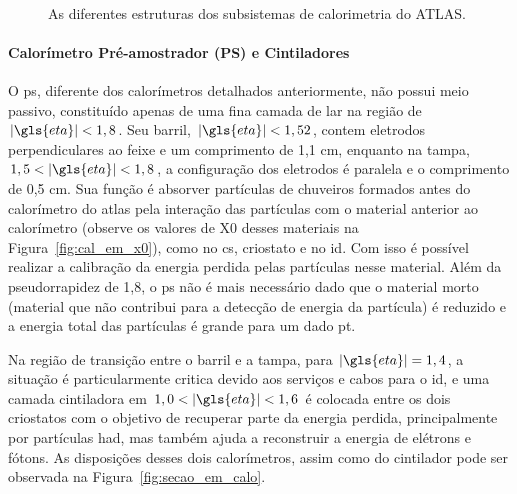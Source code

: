 \begin{figure}[ht!]
\begin{center}
{        }\hspace{0.01\textwidth}
         \\
%
    \end{center}
    \caption[As diferentes estruturas dos subsistemas de calorimetria do ATLAS]{%
As diferentes estruturas dos subsistemas de calorimetria do ATLAS.
     }%
\end{figure}


\paragraph{Calorímetro Pré-amostrador (PS) e Cintiladores}
\label{par:cal_ps}

O \gls{ps}, diferente dos calorímetros detalhados anteriormente, não possui meio passivo, 
constituído apenas de uma fina camada de \gls{lar} na região de
$|\gls{eta}|<1,8$. Seu barril, $|\gls{eta}|<1,52$, contem eletrodos
perpendiculares ao feixe e um comprimento de 1,1 cm, enquanto na tampa,
$1,5<|\gls{eta}|<1,8$, a configuração dos eletrodos é paralela e o comprimento
de 0,5 cm. Sua função é absorver partículas de chuveiros formados antes do
calorímetro do \gls{atlas} pela interação das partículas com o material anterior
ao calorímetro (observe os valores de \gls{X0} desses materiais na Figura~\ref{fig:cal_em_x0}), 
como no \gls{cs}, criostato e no \gls{id}. Com isso é possível realizar 
a calibração da energia perdida pelas partículas nesse material.
Além da pseudorrapidez de 1,8, o \gls{ps} não é mais 
necessário dado que o material morto (material que não contribui para a detecção
de energia da partícula) é reduzido e a energia total das partículas 
é grande para um dado \gls{pt}.

Na região de transição entre o barril e a tampa, para
$|\gls{eta}| = 1,4$, a situação é particularmente critica devido aos serviços e
cabos para o \gls{id}, e uma camada cintiladora em $1,0<|\gls{eta}|<1,6$ 
é colocada entre os dois criostatos com o objetivo de recuperar parte 
da energia perdida, principalmente por
partículas \gls{had}, mas também ajuda a reconstruir a energia de elétrons e
fótons. As disposições desses dois calorímetros, assim como do cintilador pode 
ser observada na Figura~\ref{fig:secao_em_calo}. 


